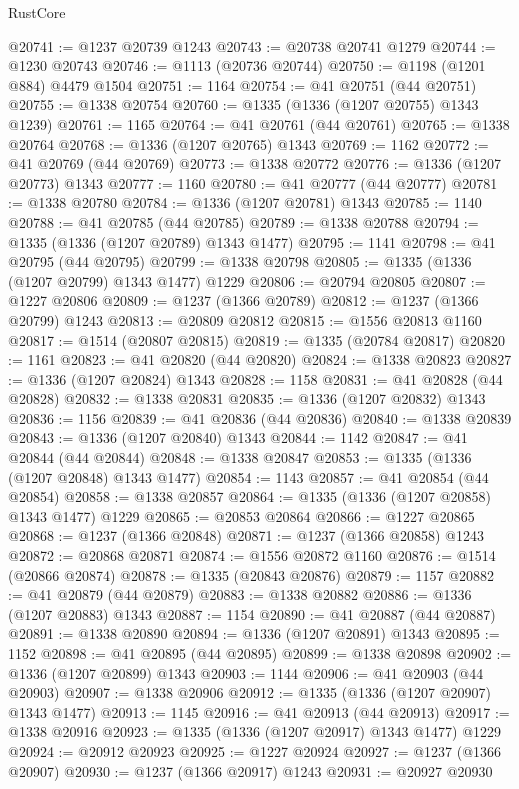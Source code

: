 \begin{lexlean}{RustCore}
\begin{coremodule}
@20741 := @1237 @20739 @1243
@20743 := @20738 @20741 @1279
@20744 := @1230 @20743
@20746 := @1113 (@20736 @20744)
@20750 := @1198 (@1201 @884) @4479 @1504
@20751 := 1164
@20754 := @41 @20751 (@44 @20751)
@20755 := @1338 @20754
@20760 := @1335 (@1336 (@1207 @20755) @1343 @1239)
@20761 := 1165
@20764 := @41 @20761 (@44 @20761)
@20765 := @1338 @20764
@20768 := @1336 (@1207 @20765) @1343
@20769 := 1162
@20772 := @41 @20769 (@44 @20769)
@20773 := @1338 @20772
@20776 := @1336 (@1207 @20773) @1343
@20777 := 1160
@20780 := @41 @20777 (@44 @20777)
@20781 := @1338 @20780
@20784 := @1336 (@1207 @20781) @1343
@20785 := 1140
@20788 := @41 @20785 (@44 @20785)
@20789 := @1338 @20788
@20794 := @1335 (@1336 (@1207 @20789) @1343 @1477)
@20795 := 1141
@20798 := @41 @20795 (@44 @20795)
@20799 := @1338 @20798
@20805 := @1335 (@1336 (@1207 @20799) @1343 @1477) @1229
@20806 := @20794 @20805
@20807 := @1227 @20806
@20809 := @1237 (@1366 @20789)
@20812 := @1237 (@1366 @20799) @1243
@20813 := @20809 @20812
@20815 := @1556 @20813 @1160
@20817 := @1514 (@20807 @20815)
@20819 := @1335 (@20784 @20817)
@20820 := 1161
@20823 := @41 @20820 (@44 @20820)
@20824 := @1338 @20823
@20827 := @1336 (@1207 @20824) @1343
@20828 := 1158
@20831 := @41 @20828 (@44 @20828)
@20832 := @1338 @20831
@20835 := @1336 (@1207 @20832) @1343
@20836 := 1156
@20839 := @41 @20836 (@44 @20836)
@20840 := @1338 @20839
@20843 := @1336 (@1207 @20840) @1343
@20844 := 1142
@20847 := @41 @20844 (@44 @20844)
@20848 := @1338 @20847
@20853 := @1335 (@1336 (@1207 @20848) @1343 @1477)
@20854 := 1143
@20857 := @41 @20854 (@44 @20854)
@20858 := @1338 @20857
@20864 := @1335 (@1336 (@1207 @20858) @1343 @1477) @1229
@20865 := @20853 @20864
@20866 := @1227 @20865
@20868 := @1237 (@1366 @20848)
@20871 := @1237 (@1366 @20858) @1243
@20872 := @20868 @20871
@20874 := @1556 @20872 @1160
@20876 := @1514 (@20866 @20874)
@20878 := @1335 (@20843 @20876)
@20879 := 1157
@20882 := @41 @20879 (@44 @20879)
@20883 := @1338 @20882
@20886 := @1336 (@1207 @20883) @1343
@20887 := 1154
@20890 := @41 @20887 (@44 @20887)
@20891 := @1338 @20890
@20894 := @1336 (@1207 @20891) @1343
@20895 := 1152
@20898 := @41 @20895 (@44 @20895)
@20899 := @1338 @20898
@20902 := @1336 (@1207 @20899) @1343
@20903 := 1144
@20906 := @41 @20903 (@44 @20903)
@20907 := @1338 @20906
@20912 := @1335 (@1336 (@1207 @20907) @1343 @1477)
@20913 := 1145
@20916 := @41 @20913 (@44 @20913)
@20917 := @1338 @20916
@20923 := @1335 (@1336 (@1207 @20917) @1343 @1477) @1229
@20924 := @20912 @20923
@20925 := @1227 @20924
@20927 := @1237 (@1366 @20907)
@20930 := @1237 (@1366 @20917) @1243
@20931 := @20927 @20930

\end{coremodule}
\end{lexlean}
